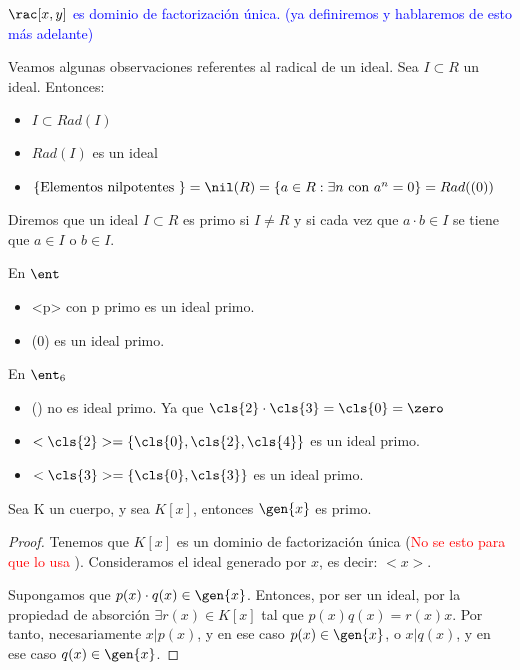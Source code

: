 \textcolor{blue}{\obs $\rac[x,y]$ es dominio de factorización única. (ya definiremos y hablaremos de esto más adelante)}

Veamos algunas observaciones referentes al radical de un ideal. Sea $I \subset R$ un ideal. Entonces:
\begin{itemize}
	\item $I \subset Rad(I)$
	\item $Rad(I)$ es un ideal
	\item $\{\text{Elementos nilpotentes }\}=\nil(R)=\{a\in R: \exists n \text{ con }a^n=0 \}=Rad((0))$
\end{itemize}

\begin{defn}
	Diremos que un ideal $I\subset R$ es primo si $I\neq R$ y si cada vez que $a\cdot b \in I$ se tiene que $a\in I$ o $b\in I$.
\end{defn}

\begin{example} En $\ent$
	\begin{itemize}
		\item <p> con p primo es un ideal primo.
		\item (0) es un ideal primo.
	\end{itemize}
\end{example}

\begin{example} En $\ent_6$
	\begin{itemize}
		\item (\zero) no es ideal primo. Ya que $\cls{2} \cdot \cls{3}=\cls{0}=\zero$
		\item $<\cls{2}>=\{\cls{0},\cls{2},\cls{4} \}$ es un ideal primo.
		\item $<\cls{3}>=\{\cls{0},\cls{3} \}$ es un ideal primo.
	\end{itemize}
\end{example}

\begin{prop}
	Sea K un cuerpo, y sea $K[x]$, entonces $\gen{x}$ es primo.
\end{prop}
\begin{proof}
	Tenemos que $K[x]$ es un dominio de factorización única (\textcolor{red}{No se esto para que lo usa} ). Consideramos el ideal generado por $x$, es decir: $<x>$.

	Supongamos que $p(x)\cdot q(x) \in \gen{x}$. Entonces, por ser un ideal, por la propiedad de absorción $\exists r(x) \in K[x]$ tal que $p(x) q(x)=r(x) x$. Por tanto, necesariamente $x|p(x)$, y en ese caso $p(x) \in \gen{x}$, o $x|q(x)$, y en ese caso $q(x) \in \gen{x}$.
\end{proof}

